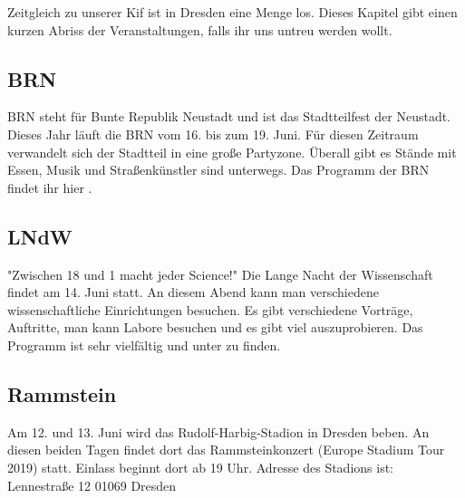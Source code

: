 Zeitgleich zu unserer Kif ist in Dresden eine Menge los. Dieses Kapitel gibt einen kurzen Abriss der Veranstaltungen, falls ihr uns untreu werden wollt.

\subsection*{BRN}
BRN steht für Bunte Republik Neustadt und ist das Stadtteilfest der Neustadt.
Dieses Jahr läuft die BRN vom 16. bis zum 19. Juni. Für diesen Zeitraum verwandelt sich der Stadtteil in eine große Partyzone.
Überall gibt es Stände mit Essen, Musik und Straßenkünstler sind unterwegs.
Das Programm der BRN findet ihr hier .

\subsection*{LNdW}
"Zwischen 18 und 1 macht jeder Science!"
Die Lange Nacht der Wissenschaft findet am 14. Juni statt.
An diesem Abend kann man verschiedene wissenschaftliche Einrichtungen besuchen.
Es gibt verschiedene Vorträge, Auftritte, man kann Labore besuchen und es gibt viel auszuprobieren.
Das Programm ist sehr vielfältig und unter  zu finden.

\subsection*{Rammstein}
Am 12. und 13. Juni wird das Rudolf-Harbig-Stadion in Dresden beben. An diesen beiden Tagen findet dort das Rammsteinkonzert (Europe Stadium Tour 2019) statt. Einlass beginnt dort ab 19 Uhr.
Adresse des Stadions ist:
Lennestraße 12
01069 Dresden
